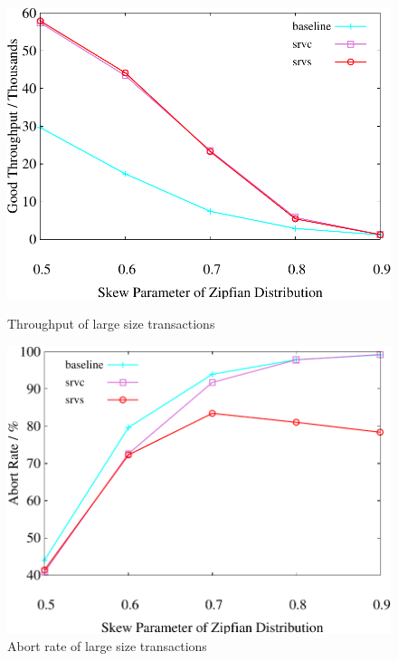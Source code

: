 \begin{figure}[t]
    \centering
        \begin{minipage}[b]{0.32\linewidth}
        \centering
        \includegraphics[width=\textwidth]{./exp_fig/weighted_size/tps_1}
        \vspace{-2em}
        \caption{Throughput of large size transactions}
        \label{fig:weighted:tps1}
    \end{minipage}
    \begin{minipage}[b]{0.32\linewidth}
        \centering
        \includegraphics[width=\textwidth]{./exp_fig/weighted_size/abort_1}
        \vspace{-2em}
        \caption{Abort rate of large size transactions}

\end{minipage}
\end{figure}
